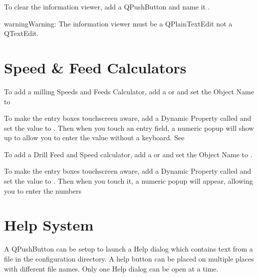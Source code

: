 \documentclass[letterpaper,10pt,english]{sphinxmanual}
\begin{document}
\sphinxAtStartPar
To clear the information viewer, add a QPushButton and name it .

\begin{sphinxadmonition}{warning}{Warning:}
\sphinxAtStartPar
The information viewer must be a QPlainTextEdit not a QTextEdit.
\end{sphinxadmonition}


\section{Speed \& Feed Calculators}
\label{\detokenize{misc:speed-feed-calculators}}
\sphinxAtStartPar
To add a milling Speeds and Feeds Calculator, add a  or  and
set the Object Name to 


\sphinxAtStartPar
To make the entry boxes touch\sphinxhyphen{}screen aware, add a Dynamic Property called
 and set the value to . Then when you touch an entry field, a
numeric popup will show up to allow you to enter the value without a keyboard.
See {\hyperref[\detokenize{property::doc}]{}}


\sphinxAtStartPar
To add a Drill Feed and Speed calculator, add a  or  and set
the Object Name to .

\sphinxAtStartPar
To make the entry boxes touch\sphinxhyphen{}screen aware, add a Dynamic Property called
 and set the value to . Then when you touch it, a numeric popup
will appear, allowing you to enter the numbers



\section{Help System}
\label{\detokenize{misc:help-system}}
\sphinxAtStartPar
A QPushButton can be setup to launch a Help dialog which contains text from a
file in the configuration directory. A help button can be placed on multiple
places with different file names. Only one Help dialog can be open at a time.
\end{document}
